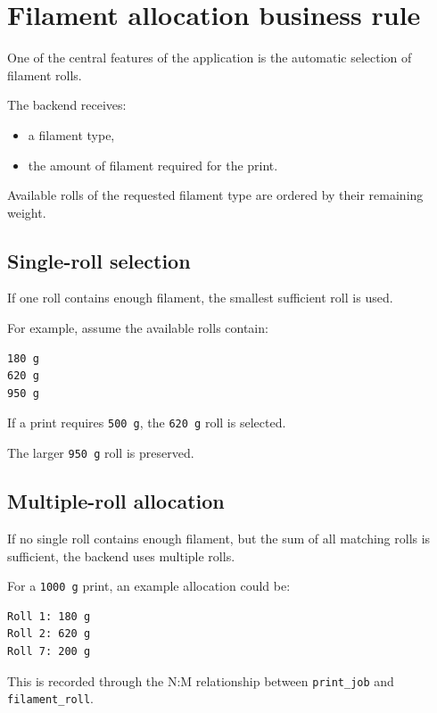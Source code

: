 \documentclass[a4paper,11pt]{article}
\begin{document}
\section{Filament allocation business rule}

One of the central features of the application is the automatic selection of
filament rolls.

The backend receives:

\begin{itemize}
  \item a filament type,
  \item the amount of filament required for the print.
\end{itemize}

Available rolls of the requested filament type are ordered by their remaining
weight.

\subsection{Single-roll selection}

If one roll contains enough filament, the smallest sufficient roll is used.

For example, assume the available rolls contain:

\begin{lstlisting}
180 g
620 g
950 g
\end{lstlisting}

If a print requires \texttt{500 g}, the \texttt{620 g} roll is selected.

The larger \texttt{950 g} roll is preserved.

\subsection{Multiple-roll allocation}

If no single roll contains enough filament, but the sum of all matching rolls
is sufficient, the backend uses multiple rolls.

For a \texttt{1000 g} print, an example allocation could be:

\begin{lstlisting}
Roll 1: 180 g
Roll 2: 620 g
Roll 7: 200 g
\end{lstlisting}

This is recorded through the N:M relationship between
\texttt{print\_job} and \texttt{filament\_roll}.
\end{document}

